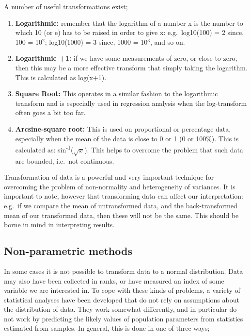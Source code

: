 \documentclass[
]{book}
\providecommand{\tightlist}{%
  \setlength{\itemsep}{0pt}\setlength{\parskip}{0pt}}
\begin{document}
A number of useful transformations exist;

\begin{enumerate}
\def\labelenumi{\arabic{enumi})}
\tightlist
\item
  \textbf{Logarithmic:} remember that the logarithm of a number x is the number to which 10 (or e) has to be raised in order to give x: e.g.~log10(100) = 2 since, 100 = 10\(^2\); log10(1000) = 3 since, 1000 = 10\(^3\), and so on.
\item
  \textbf{Logarithmic +1:} if we have some measurements of zero, or close to zero, then this may be a more effective transform that simply taking the logarithm. This is calculated as log(x+1).
\item
  \textbf{Square Root:} This operates in a similar fashion to the logarithmic transform and is especially used in regression analysis when the log-transform often goes a bit too far.
\item
  \textbf{Arcsine-square root:} This is used on proportional or percentage data, especially when the mean of the data is close to 0 or 1 (0 or 100\%). This is calculated as: sin\textsuperscript{-1}(\(\sqrt{x}\)). This helps to overcome the problem that such data are bounded, i.e.~not continuous.
\end{enumerate}

Transformation of data is a powerful and very important technique for overcoming the problem of non-normality and heterogeneity of variances. It is important to note, however that transforming data can affect our interpretation: e.g.~if we compare the mean of untransformed data, and the back-transformed mean of our transformed data, then these will not be the same. This should be borne in mind in interpreting results.

\subsection*{Non-parametric methods}\label{non-parametric-methods}

In some cases it is not possible to transform data to a normal distribution. Data may also have been collected in ranks, or have measured an index of some variable we are interested in. To cope with these kinds of problems, a variety of statistical analyses have been developed that do not rely on assumptions about the distribution of data. They work somewhat differently, and in particular do not work by predicting the likely values of population parameters from statistics estimated from samples. In general, this is done in one of three ways;
\end{document}

